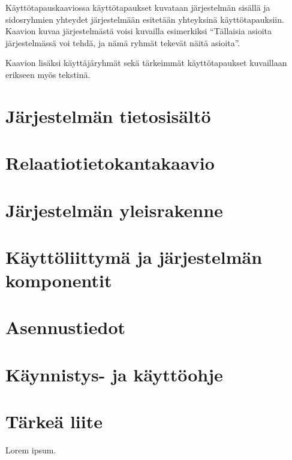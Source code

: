 \documentclass[12pt,a4paper,titlepage]{article}
\begin{document}
Käyttötapauskaaviossa käyttötapaukset kuvataan järjestelmän sisällä ja sidosryhmien yhteydet järjestelmään esitetään yhteyksinä käyttötapauksiin. Kaavion kuvaa järjestelmästä voisi kuvailla esimerkiksi “Tällaisia asioita järjestelmässä voi tehdä, ja nämä ryhmät tekevät näitä asioita”.

Kaavion lisäksi käyttäjäryhmät sekä tärkeimmät käyttötapaukset kuvaillaan erikseen myös tekstinä.

\section{Järjestelmän tietosisältö}

\section{Relaatiotietokantakaavio}

\section{Järjestelmän yleisrakenne}

\section{Käyttöliittymä ja järjestelmän komponentit}

\section{Asennustiedot}

\section{Käynnistys- ja käyttöohje}




\small


\appendix
\section{Tärkeä liite}
Lorem ipsum.
\newpage
\end{document}
